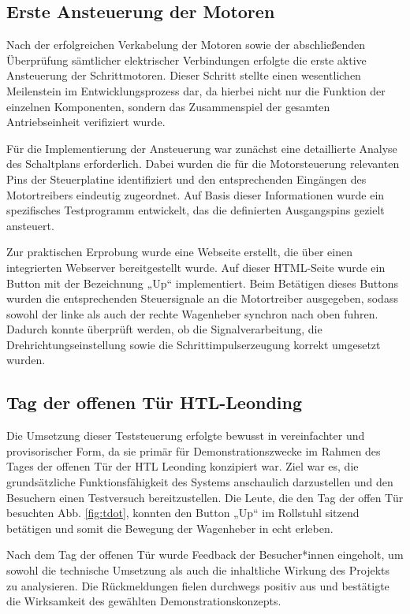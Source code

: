 \subsection{Erste Ansteuerung der Motoren}
Nach der erfolgreichen Verkabelung der Motoren sowie der abschließenden Überprüfung sämtlicher elektrischer Verbindungen erfolgte die erste aktive Ansteuerung der Schrittmotoren. Dieser Schritt stellte einen wesentlichen Meilenstein im Entwicklungsprozess dar, da hierbei nicht nur die Funktion der einzelnen Komponenten, sondern das Zusammenspiel der gesamten Antriebseinheit verifiziert wurde.

Für die Implementierung der Ansteuerung war zunächst eine detaillierte Analyse des Schaltplans erforderlich. Dabei wurden die für die Motorsteuerung relevanten Pins der Steuerplatine identifiziert und den entsprechenden Eingängen des Motortreibers eindeutig zugeordnet. Auf Basis dieser Informationen wurde ein spezifisches Testprogramm entwickelt, das die definierten Ausgangspins gezielt ansteuert.

Zur praktischen Erprobung wurde eine Webseite erstellt, die über einen integrierten Webserver bereitgestellt wurde. Auf dieser HTML-Seite wurde ein Button mit der Bezeichnung „Up“ implementiert. Beim Betätigen dieses Buttons wurden die entsprechenden Steuersignale an die Motortreiber ausgegeben, sodass sowohl der linke als auch der rechte Wagenheber synchron nach oben fuhren. Dadurch konnte überprüft werden, ob die Signalverarbeitung, die Drehrichtungseinstellung sowie die Schrittimpulserzeugung korrekt umgesetzt wurden.

\subsection{Tag der offenen Tür HTL-Leonding}
Die Umsetzung dieser Teststeuerung erfolgte bewusst in vereinfachter und provisorischer Form, da sie primär 
für Demonstrationszwecke im Rahmen des Tages der offenen Tür der HTL Leonding konzipiert war. Ziel war es, 
die grundsätzliche Funktionsfähigkeit des Systems anschaulich darzustellen und den Besuchern einen Testversuch
bereitzustellen. Die Leute, die den Tag der offen Tür besuchten Abb. \ref{fig:tdot}, konnten den Button „Up“ 
im Rollstuhl sitzend betätigen und somit die Bewegung der Wagenheber in echt erleben. 

Nach dem Tag der offenen Tür wurde Feedback der Besucher*innen eingeholt, um sowohl die technische Umsetzung 
als auch die inhaltliche Wirkung des Projekts zu analysieren. Die Rückmeldungen fielen durchwegs positiv aus 
und bestätigte die Wirksamkeit des gewählten Demonstrationskonzepts.

